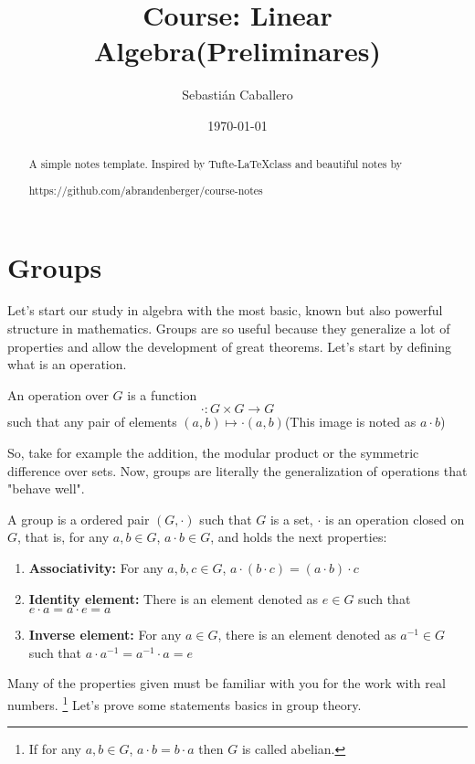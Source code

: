 \documentclass{tufte-handout}
\title{Course:  Linear Algebra(Preliminares)}
\author{Sebastián Caballero}
\date{\today}
\begin{document}
\maketitle

\begin{abstract}
\noindent
A simple notes template. Inspired by Tufte-\LaTeX class and beautiful notes by \begin{verbatim*}
	https://github.com/abrandenberger/course-notes
\end{verbatim*}
\end{abstract}

\section{Groups}
Let's start our study in algebra with the most basic, known but also powerful structure in mathematics. Groups are so useful because they generalize a lot of properties and allow the development of great theorems. Let's start by defining what is an operation.

\begin{definition}[Operation]
	An operation over $G$ is a function $$\cdot : G \times G \to G$$ such that any pair of elements $(a, b) \mapsto \cdot(a, b)$(This image is noted as $a \cdot b$) 
\end{definition}

So, take for example the addition, the modular product or the symmetric difference over sets. Now, groups are literally the generalization of operations that "behave well".

\begin{definition}[Group]
	A group is a ordered pair $(G, \cdot)$ such that $G$ is a set, $\cdot$ is an operation closed on $G$, that is, for any $a, b \in G$, $a \cdot b \in G$, and holds the next properties:
	\begin{enumerate}
		\item \textbf{Associativity:} For any $a, b, c \in G$, $a \cdot (b \cdot c) = (a\cdot b) \cdot c$
		\item \textbf{Identity element:} There is an element denoted as $e \in G$ such that $e \cdot a = a \cdot e = a$
		\item \textbf{Inverse element:} For any $a \in G$, there is an element denoted as $a^{-1} \in G$ such that $a \cdot a^{-1} = a^{-1} \cdot a = e$
	\end{enumerate}
\end{definition}
Many of the properties given must be familiar with you for the work with real numbers. \footnote{If for any $a, b \in G$, $a \cdot b = b \cdot a$ then $G$ is called abelian.} Let's prove some statements basics in group theory.
\end{document}
